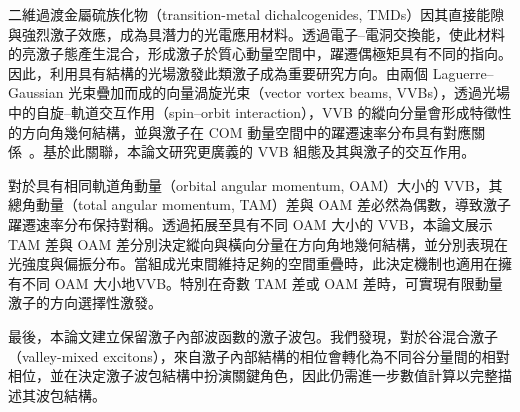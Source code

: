 
\begin{zhAbstract}
二維過渡金屬硫族化物（transition-metal dichalcogenides, TMDs）因其直接能隙與強烈激子效應，成為具潛力的光電應用材料。透過電子–電洞交換能，使此材料的亮激子態產生混合，形成激子於質心動量空間中，躍遷偶極矩具有不同的指向。因此，利用具有結構的光場激發此類激子成為重要研究方向。由兩個 Laguerre–Gaussian 光束疊加而成的向量渦旋光束（vector vortex beams, VVBs），透過光場中的自旋–軌道交互作用（spin–orbit interaction），VVB 的縱向分量會形成特徵性的方向角幾何結構，並與激子在 COM 動量空間中的躍遷速率分布具有對應關係~\cite{sanchez2024enhanced}。基於此關聯，本論文研究更廣義的 VVB 組態及其與激子的交互作用。

對於具有相同軌道角動量（orbital angular momentum, OAM）大小的 VVB，其總角動量（total angular momentum, TAM）差與 OAM 差必然為偶數，導致激子躍遷速率分布保持對稱。透過拓展至具有不同 OAM 大小的 VVB，本論文展示 TAM 差與 OAM 差分別決定縱向與橫向分量在方向角地幾何結構，並分別表現在光強度與偏振分布。當組成光束間維持足夠的空間重疊時，此決定機制也適用在擁有不同 OAM 大小地VVB。特別在奇數 TAM 差或 OAM 差時，可實現有限動量激子的方向選擇性激發。

最後，本論文建立保留激子內部波函數的激子波包。我們發現，對於谷混合激子（valley-mixed excitons），來自激子內部結構的相位會轉化為不同谷分量間的相對相位，並在決定激子波包結構中扮演關鍵角色，因此仍需進一步數值計算以完整描述其波包結構。
    \zhAbsKeywords
\end{zhAbstract}
